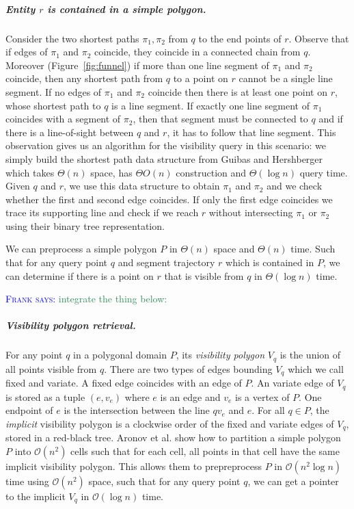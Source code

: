 \documentclass[UKenglish]{lipics-v2019}
\newcommand{\myremark}[4]{\textcolor{blue}{\textsc{#1 #2:}} \textcolor{#4}{\textsf{#3}}}
\newcommand{\frank}[2][says]{\myremark{Frank}{#1}{#2}{SeaGreen}}
\newcommand{\etal}{\textnormal{et al.}\xspace}
\begin{document}
\subparagraph{Entity $r$ is contained in a simple polygon.}
Consider the two shortest paths $\pi_1, \pi_2$ from $q$ to the end points of $r$. Observe that if edges of $\pi_1$ and $\pi_2$ coincide, they coincide in a connected chain from $q$. Moreover (Figure~\ref{fig:funnel}) if more than one line segment of $\pi_1$ and $\pi_2$ coincide, then any shortest path from $q$ to a point on $r$ cannot be a single line segment. If no edges of $\pi_1$ and $\pi_2$ coincide then there is at least one point on $r$, whose shortest path to $q$ is a line segment. If exactly one line segment of $\pi_1$ coincides with a segment of $\pi_2$, then that segment must be connected to $q$ and if there is a line-of-sight between $q$ and $r$, it has to follow that line segment. This observation gives us an algorithm for the visibility query in this scenario: we simply build the shortest path data structure from Guibas and Hershberger which takes $\Theta(n)$ space, has $\Theta{O}(n)$ construction and $\Theta(\log n)$ query time. Given $q$ and $r$, we use this data structure to obtain $\pi_1$ and $\pi_2$ and we check whether the first and second edge coincides. If only the first edge coincides we trace its supporting line and check if we reach $r$ without intersecting $\pi_1$ or $\pi_2$ using their binary tree representation.

\begin{theorem}
We can preprocess a simple polygon $P$ in $\Theta(n)$ space and $\Theta(n)$ time. Such that for any query point $q$ and segment trajectory $r$ which is contained in $P$, we can determine if there is a point on $r$ that is visible from $q$ in $\Theta(\log n)$ time.
\end{theorem}




\frank{integrate the thing below:}
\subparagraph{Visibility polygon retrieval.}
For any point $q$ in a polygonal domain $P$, its \emph{visibility polygon} $V_q$ is the union of all points visible from $q$. There are two types of edges bounding $V_q$ which we call fixed and variate. A fixed edge coincides with an edge of $P$. An variate edge of $V_q$ is stored as a tuple $(e, v_e)$ where $e$ is an edge and $v_e$ is a vertex of $P$. One endpoint of $e$ is the intersection between the line $qv_e$ and $e$. For all $q \in P$, the \emph{implicit} visibility polygon is a clockwise order of the fixed and variate edges of $V_q$, stored in a red-black tree. Aronov \etal \cite{aronov2002visibility} show how to partition a simple polygon $P$ into $\mathcal{O}(n^2)$ cells such that for each cell, all points in that cell have the same implicit visibility polygon. This allows them to prepreprocess $P$ in $\mathcal{O}(n^2\log n)$ time using $\mathcal{O}(n^2)$ space, such that for any query point $q$, we can get a pointer to the implicit $V_q$ in $\mathcal{O}(\log n)$ time. 
%
\end{document}

